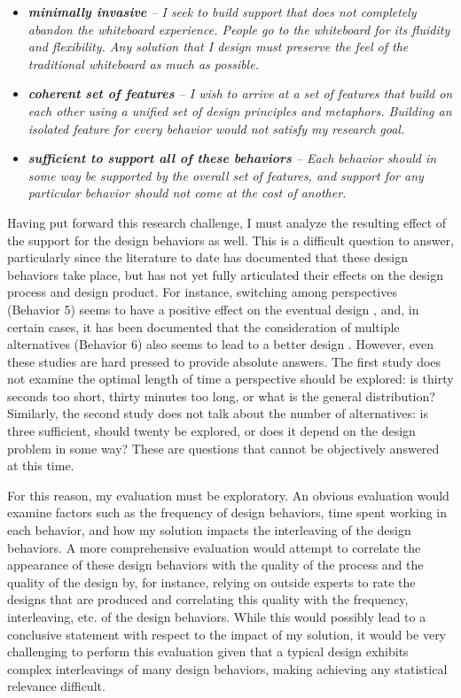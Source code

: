 \begin{itemize}

\item \emph{\textbf{minimally invasive} -- I seek to build support that does not completely abandon the whiteboard experience. People go to the whiteboard for its fluidity and flexibility. Any solution that I design must preserve the feel of the traditional whiteboard as much as possible.}

\item \emph{\textbf{coherent set of features} -- I wish to arrive at a set of features that build on each other using a unified set of design principles and metaphors. Building an isolated feature for every behavior would not satisfy my research goal.}

\item \emph{\textbf{sufficient to support all of these behaviors} -- Each behavior should in some way be supported by the overall set of features, and support for any particular behavior should not come at the cost of another. }
\end{itemize}

Having put forward this research challenge, I must analyze the resulting effect of the support for the design behaviors as well. This is a difficult question to answer, particularly since the literature to date has documented that these design behaviors take place, but has not yet fully articulated their effects on the design process and design product. For instance, switching among perspectives (Behavior 5) seems to have a positive effect on the eventual design \cite{baker2010ideas}, and, in certain cases, it has been documented that the consideration of multiple alternatives (Behavior 6) also seems to lead to a better design \cite{buxton2010sketching}. However, even these studies are hard pressed to provide absolute answers. The first study does not examine the optimal length of time a perspective should be explored: is thirty seconds too short, thirty minutes too long, or what is the general distribution? Similarly, the second study does not talk about the number of alternatives: is three sufficient, should twenty be explored, or does it depend on the design problem in some way? These are questions that cannot be objectively answered at this time. 

For this reason, my evaluation must be exploratory. An obvious evaluation would examine factors such as the frequency of design behaviors, time spent working in each behavior, and how my solution impacts the interleaving of the design behaviors. A more comprehensive evaluation would attempt to correlate the appearance of these design behaviors with the quality of the process and the quality of the design by, for instance, relying on outside experts to rate the designs that are produced and correlating this quality with the frequency, interleaving, etc. of the design behaviors. While this would possibly lead to a conclusive statement with respect to the impact of my solution, it would be very challenging to perform this evaluation given that a typical design exhibits complex interleavings of many design behaviors, making achieving any statistical relevance difficult. 

